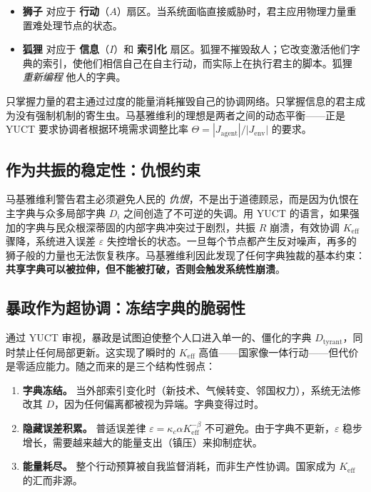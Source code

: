\documentclass[12pt,a4paper]{article}
\newcommand{\Keff}{K_{\mathrm{eff}}}
\begin{document}
	\begin{itemize}[leftmargin=*]
		\item \textbf{狮子} 对应于 \textbf{行动}（\(A\)）扇区。当系统面临直接威胁时，君主应用物理力量重置难处理节点的状态。
		\item \textbf{狐狸} 对应于 \textbf{信息}（\(I\)）和 \textbf{索引化} 扇区。狐狸不摧毁敌人；它改变激活他们字典的索引，使他们相信自己在自主行动，而实际上在执行君主的脚本。狐狸 \emph{重新编程} 他人的字典。
	\end{itemize}
	
	只掌握力量的君主通过过度的能量消耗摧毁自己的协调网络。只掌握信息的君主成为没有强制机制的寄生虫。马基雅维利的理想是两者之间的动态平衡——正是 YUCT 要求协调者根据环境需求调整比率 \(\Theta = |J_{\mathrm{agent}}|/|J_{\mathrm{env}}|\) 的要求。
	
	\subsection{作为共振的稳定性：仇恨约束}
	
	马基雅维利警告君主必须避免人民的 \emph{仇恨}，不是出于道德顾忌，而是因为仇恨在主字典与众多局部字典 \(D_i\) 之间创造了不可逆的失调。用 YUCT 的语言，如果强加的字典与民众根深蒂固的内部字典冲突过于剧烈，共振 \(R\) 崩溃，有效协调 \(\Keff\) 骤降，系统进入误差 \(\varepsilon\) 失控增长的状态。一旦每个节点都产生反对噪声，再多的狮子般的力量也无法恢复秩序。马基雅维利因此发现了任何字典独裁的基本约束：\textbf{共享字典可以被拉伸，但不能被打破，否则会触发系统性崩溃}。
	
	\subsection{暴政作为超协调：冻结字典的脆弱性}
	
	通过 YUCT 审视，暴政是试图迫使整个人口进入单一的、僵化的字典 \(D_{\text{tyrant}}\)，同时禁止任何局部更新。这实现了瞬时的 \(\Keff\) 高值——国家像一体行动——但代价是零适应能力。随之而来的是三个结构性弱点：
	
	\begin{enumerate}[leftmargin=*]
		\item \textbf{字典冻结。} 当外部索引变化时（新技术、气候转变、邻国权力），系统无法修改其 \(D\)，因为任何偏离都被视为异端。字典变得过时。
		\item \textbf{隐藏误差积累。} 普适误差律 \(\varepsilon = \kappa_c \alpha \Keff^{-\beta}\) 不可避免。由于字典不更新，\(\varepsilon\) 稳步增长，需要越来越大的能量支出（镇压）来抑制症状。
		\item \textbf{能量耗尽。} 整个行动预算被自我监督消耗，而非生产性协调。国家成为 \(K_{\mathrm{eff}}\) 的汇而非源。
	\end{enumerate}
	
\end{document}
